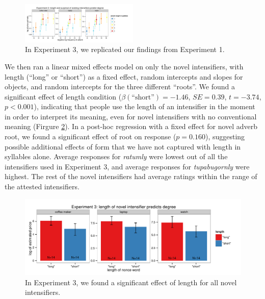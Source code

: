 \documentclass[10pt,letterpaper]{article}
\newcommand{\w}[1]{\emph{#1}}
\begin{document}
\begin{figure}[hbt]
\begin{center}
\includegraphics[width=0.5\textwidth]{exp3_replication.pdf}
\end{center}
\caption{In Experiment 3, we replicated our findings from Experiment 1.} 
\label{exp3_replication}
\end{figure}

We then ran a linear mixed effects model on only the novel intensifiers, with length (``long'' or ``short'') as a fixed effect, random intercepts and slopes for objects, and random intercepts for the three different ``roots''. We found a significant effect of length condition ($\beta(\mbox{``short''})=-1.46$, $SE=0.39$, $t=-3.74$, $p<0.001$), indicating that people use the length of an intensifier in the moment in order to interpret its meaning, even for novel intensifiers with no conventional meaning (Firgure \ref{exp3_novel}).
In a post-hoc regression with a fixed effect for novel adverb root, we found a significant effect of root on response ($p=0.160$), suggesting possible additional effects of form that we have not captured with length in syllables alone. Average responses for \w{ratumly} were lowest out of all the intensifiers used in Experiment 3, and average responses for \w{tupabugornly} were highest. The rest of the novel intensifiers had average ratings within the range of the attested intensifiers.

\begin{figure}[hbt]
\begin{center}
\includegraphics[width=\textwidth]{free_response_nonce_intensifiers_length.pdf}
\end{center}
\caption{In Experiment 3, we found a significant effect of length for all novel intensifiers.} 
\label{exp3_novel}
\end{figure}
\end{document}
